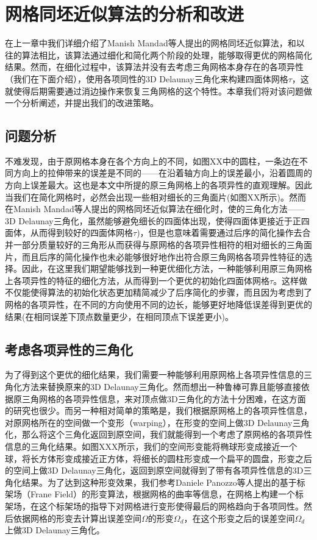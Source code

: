 \chapter{网格同坯近似算法的分析和改进}

在上一章中我们详细介绍了Manish Mandad等人提出的网格同坯近似算法\cite{isotopic-appro}，和以往的算法相比，该算法通过细化和简化两个阶段的处理，能够取得更优的网格简化结果。然而，在细化过程中，该算法并没有去考虑三角网格本身存在的各项异性（我们在下面介绍），使用各项同性的3D Delaunay三角化来构建四面体网格$\tau$，这就使得后期需要通过消边操作来恢复三角网格的这个特性。本章我们将对该问题做一个分析阐述，并提出我们的改进策略。

\section{问题分析}
不难发现，由于原网格本身在各个方向上的不同，如图XX中的圆柱，一条边在不同方向上的拉伸带来的误差是不同的——在沿着轴方向上的误差最小，沿着圆周的方向上误差最大。这也是本文中所提的原三角网格上的各项异性的直观理解。因此当我们在简化网格时，必然会出现一些相对细长的三角面片(如图XX所示)。然而在Manish Mandad等人提出的网格同坯近似算法在细化时，使的三角化方法——3D Delaunay三角化，虽然能够避免细长的四面体出现，使得四面体更接近于正四面体，从而得到较好的四面体网格$\tau$)，但是也意味着需要通过后序的简化操作去合并一部分质量较好的三角形从而获得与原网格的各项异性相符的相对细长的三角面片，而且后序的简化操作也未必能够很好地作出符合原三角网格各项异性特征的选择。因此，在这里我们期望能够找到一种更优细化方法，一种能够利用原三角网格上各项异性的特征的细化方法，从而得到一个更优的初始化四面体网格$\tau$。这样做不仅能使得算法的初始化状态更加精简减少了后序简化的步骤，而且因为考虑到了网格的各项异性，在不同的方向使用不同的边长，能够更好地降低误差得到更优的结果(在相同误差下顶点数量更少，在相同顶点下误差更小)。

\section{考虑各项异性的三角化}
为了得到这个更优的细化结果，我们需要一种能够利用原网格上各项异性信息的三角化方法来替换原来的3D Delaunay三角化。然而想出一种鲁棒可靠且能够直接依据原三角网格的各项异性信息，来对顶点做3D三角化的方法十分困难，在这方面的研究也很少。而另一种相对简单的策略是，我们根据原网格上的各项异性信息，对原网格所在的空间做一个变形（warping），在形变的空间上做3D Delaunay三角化，那么将这个三角化返回到原空间，我们就能得到一个考虑了原网格的各项异性信息的三角化结果。如图XXX所示，我们的空间形变能将椭球形变成接近一个球，将长方体形变成接近正方体，将细长的圆柱形变成一个扁平的圆盘，形变之后的空间上做3D Delaunay三角化，返回到原空间就得到了带有各项异性信息的3D三角化结果。为了达到这种形变效果，我们参考Daniele Panozzo等人提出的基于标架场（Frane Field）的形变算法，根据网格的曲率等信息，在网格上构建一个标架场，在这个标架场的指导下对网格进行变形使得最后的网格趋向于各项同性。然后依据网格的形变去计算出误差空间$\Omega$的形变$\Omega_d$，在这个形变之后的误差空间$\Omega_d$上做3D Delaunay三角化。

